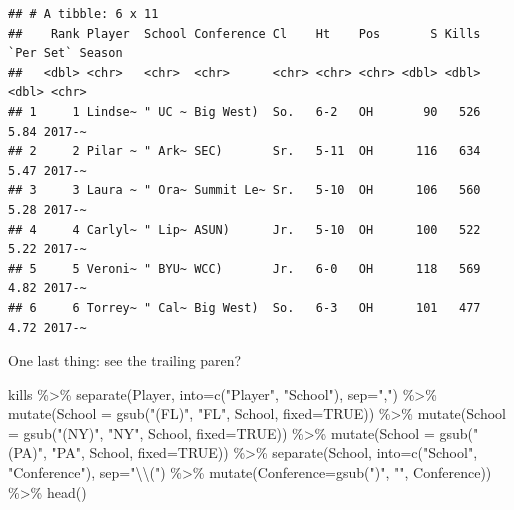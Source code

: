 \documentclass[
]{book}
\newenvironment{Shaded}{\begin{snugshade}}{\end{snugshade}}
\newcommand{\AttributeTok}[1]{\textcolor[rgb]{0.77,0.63,0.00}{#1}}
\newcommand{\ConstantTok}[1]{\textcolor[rgb]{0.00,0.00,0.00}{#1}}
\newcommand{\FunctionTok}[1]{\textcolor[rgb]{0.00,0.00,0.00}{#1}}
\newcommand{\NormalTok}[1]{#1}
\newcommand{\SpecialCharTok}[1]{\textcolor[rgb]{0.00,0.00,0.00}{#1}}
\newcommand{\StringTok}[1]{\textcolor[rgb]{0.31,0.60,0.02}{#1}}
\begin{document}
\begin{verbatim}
## # A tibble: 6 x 11
##    Rank Player  School Conference Cl    Ht    Pos       S Kills `Per Set` Season
##   <dbl> <chr>   <chr>  <chr>      <chr> <chr> <chr> <dbl> <dbl>     <dbl> <chr> 
## 1     1 Lindse~ " UC ~ Big West)  So.   6-2   OH       90   526      5.84 2017-~
## 2     2 Pilar ~ " Ark~ SEC)       Sr.   5-11  OH      116   634      5.47 2017-~
## 3     3 Laura ~ " Ora~ Summit Le~ Sr.   5-10  OH      106   560      5.28 2017-~
## 4     4 Carlyl~ " Lip~ ASUN)      Jr.   5-10  OH      100   522      5.22 2017-~
## 5     5 Veroni~ " BYU~ WCC)       Jr.   6-0   OH      118   569      4.82 2017-~
## 6     6 Torrey~ " Cal~ Big West)  So.   6-3   OH      101   477      4.72 2017-~
\end{verbatim}

One last thing: see the trailing paren?

\begin{Shaded}
\begin{Highlighting}[]
\NormalTok{kills }\SpecialCharTok{\%\textgreater{}\%} 
  \FunctionTok{separate}\NormalTok{(Player, }\AttributeTok{into=}\FunctionTok{c}\NormalTok{(}\StringTok{"Player"}\NormalTok{, }\StringTok{"School"}\NormalTok{), }\AttributeTok{sep=}\StringTok{","}\NormalTok{) }\SpecialCharTok{\%\textgreater{}\%} 
  \FunctionTok{mutate}\NormalTok{(}\AttributeTok{School =} \FunctionTok{gsub}\NormalTok{(}\StringTok{"(FL)"}\NormalTok{, }\StringTok{"FL"}\NormalTok{, School, }\AttributeTok{fixed=}\ConstantTok{TRUE}\NormalTok{)) }\SpecialCharTok{\%\textgreater{}\%}
  \FunctionTok{mutate}\NormalTok{(}\AttributeTok{School =} \FunctionTok{gsub}\NormalTok{(}\StringTok{"(NY)"}\NormalTok{, }\StringTok{"NY"}\NormalTok{, School, }\AttributeTok{fixed=}\ConstantTok{TRUE}\NormalTok{)) }\SpecialCharTok{\%\textgreater{}\%}
  \FunctionTok{mutate}\NormalTok{(}\AttributeTok{School =} \FunctionTok{gsub}\NormalTok{(}\StringTok{"(PA)"}\NormalTok{, }\StringTok{"PA"}\NormalTok{, School, }\AttributeTok{fixed=}\ConstantTok{TRUE}\NormalTok{)) }\SpecialCharTok{\%\textgreater{}\%}
  \FunctionTok{separate}\NormalTok{(School, }\AttributeTok{into=}\FunctionTok{c}\NormalTok{(}\StringTok{"School"}\NormalTok{, }\StringTok{"Conference"}\NormalTok{), }\AttributeTok{sep=}\StringTok{"}\SpecialCharTok{\textbackslash{}\textbackslash{}}\StringTok{("}\NormalTok{) }\SpecialCharTok{\%\textgreater{}\%} 
  \FunctionTok{mutate}\NormalTok{(}\AttributeTok{Conference=}\FunctionTok{gsub}\NormalTok{(}\StringTok{")"}\NormalTok{, }\StringTok{""}\NormalTok{, Conference)) }\SpecialCharTok{\%\textgreater{}\%}
  \FunctionTok{head}\NormalTok{()}
\end{Highlighting}
\end{Shaded}
\end{document}
